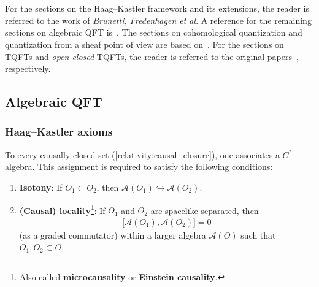 \chapter{}

    For the sections on the Haag--Kastler framework and its extensions, the reader is referred to the work of \textit{Brunetti, Fredenhagen et al}. A reference for the remaining sections on algebraic QFT is~\citet{baez_introduction_2014}. The sections on cohomological quantization and quantization from a sheaf point of view are based on~\citet{nuiten_cohomological_2013}. For the sections on TQFTs and \textit{open-closed} TQFTs, the reader is referred to the original papers~\citet{atiyah_topological_1988,lauda_openclosed_2008}, respectively.

\section{Algebraic QFT}
\subsection{Haag--Kastler axioms}\label{section:haag_kastler}

    \begin{axiom}\label{aqft:microcausality}
        To every causally closed set (\cref{relativity:causal_closure}), one associates a $C^*$-algebra. This assignment is required to satisfy the following conditions:
        \begin{enumerate}
            \item\textbf{Isotony}: If $O_1\subset O_2$, then $\mathcal{A}(O_1)\hookrightarrow\mathcal{A}(O_2)$.
            \item\textbf{(Causal) locality}\footnote{Also called \textbf{microcausality} or \textbf{Einstein causality}.}: If $O_1$ and $O_2$ are spacelike separated, then
            \begin{gather}
                \bigl[\mathcal{A}(O_1),\mathcal{A}(O_2)\bigr]=0
            \end{gather}
            (as a graded commutator) within a larger algebra $\mathcal{A}(O)$ such that $O_1,O_2\subset O$.
        \end{enumerate}
    \end{axiom}

